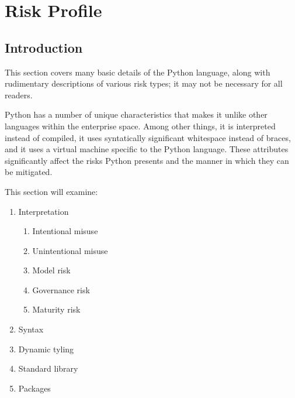 \section{Risk Profile}

	\subsection{Introduction}

		\begin{tcolorbox}
			This section covers many basic details of the Python language, along with rudimentary descriptions of various risk types; it may not be necessary for all readers.
		\end{tcolorbox}

		Python has a number of unique characteristics that makes it unlike other languages within the enterprise space. Among other things, it is interpreted instead of compiled, it uses syntatically significant whitespace instead of braces, and it uses a virtual machine specific to the Python language. These attributes significantly affect the risks Python presents and the manner in which they can be mitigated.

		This section will examine:

		\begin{enumerate}
   			\item Interpretation
   			\begin{enumerate}
	   			\item Intentional misuse
	   			\item Unintentional misuse
	   			\item Model risk
	   			\item Governance risk
	   			\item Maturity risk
   			\end{enumerate}
   			\item Syntax
   			\item Dynamic tyling
   			\item Standard library
   			\item Packages
		\end{enumerate}

